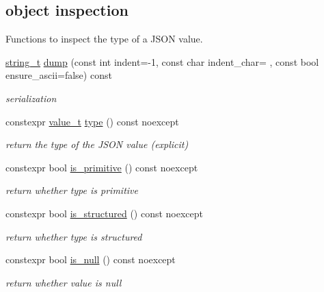\subsection*{object inspection}
\label{_amgrpbbb01a37b8f261ae5b5799058dcac1a0}%
Functions to inspect the type of a J\+S\+ON value. \begin{DoxyCompactItemize}
\item 
\mbox{\hyperlink{classnlohmann_1_1basic__json_a61f8566a1a85a424c7266fb531dca005}{string\+\_\+t}} \mbox{\hyperlink{classnlohmann_1_1basic__json_a5adea76fedba9898d404fef8598aa663}{dump}} (const int indent=-\/1, const char indent\+\_\+char=\textquotesingle{} \textquotesingle{}, const bool ensure\+\_\+ascii=false) const
\begin{DoxyCompactList}\small\item\em serialization \end{DoxyCompactList}\item 
constexpr \mbox{\hyperlink{namespacenlohmann_1_1detail_a90aa5ef615aa8305e9ea20d8a947980f}{value\+\_\+t}} \mbox{\hyperlink{classnlohmann_1_1basic__json_a2b2d781d7f2a4ee41bc0016e931cadf7}{type}} () const noexcept
\begin{DoxyCompactList}\small\item\em return the type of the J\+S\+ON value (explicit) \end{DoxyCompactList}\item 
constexpr bool \mbox{\hyperlink{classnlohmann_1_1basic__json_a6362b88718eb5c6d4fed6a61eed44b95}{is\+\_\+primitive}} () const noexcept
\begin{DoxyCompactList}\small\item\em return whether type is primitive \end{DoxyCompactList}\item 
constexpr bool \mbox{\hyperlink{classnlohmann_1_1basic__json_a9f68a0af820c3ced7f9d17851ce4c22d}{is\+\_\+structured}} () const noexcept
\begin{DoxyCompactList}\small\item\em return whether type is structured \end{DoxyCompactList}\item 
constexpr bool \mbox{\hyperlink{classnlohmann_1_1basic__json_a8faa039ca82427ed29c486ffd00600c3}{is\+\_\+null}} () const noexcept
\begin{DoxyCompactList}\small\item\em return whether value is null \end{DoxyCompactList}\item 

\end{DoxyCompactItemize}
